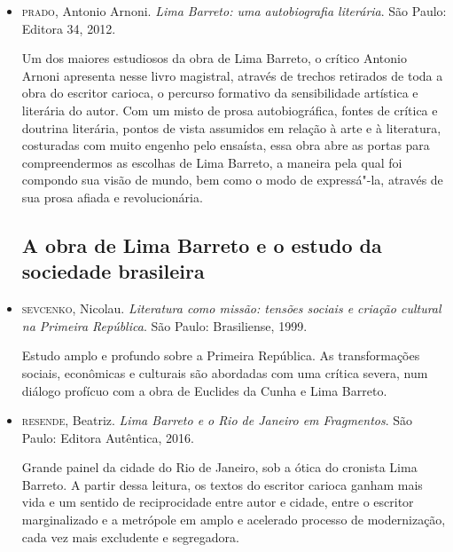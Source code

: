 \documentclass[11pt]{extarticle}
\begin{document}
{{\begin{itemize}
Principal biografia
sobre a vida de Lima Barreto. Publicado em 1952, essa obra se constitui
como o ponto de partida para a redescoberta de Lima Barreto. Assis
Barbosa também foi o organizador das \emph{Obras completas de Lima
Barreto,} publicadas em 1956, em 17 volumes, pela editora Brasiliense. O
livro \emph{A vida de Lima Barreto}, foi escrito de modo a
interrelacionar eventos da vida pessoal do autor com diversas passagens
de sua obra ficcional, assim como a contextualização da época, na
verdade um grande painel histórico, rico em detalhes e informações que
compõem um quadro muito completo desse grande escritor brasileiro.

\item \textsc{prado}, Antonio Arnoni. \emph{Lima Barreto: uma autobiografia literária}.
São Paulo: Editora 34, 2012. 

Um dos maiores estudiosos da obra de Lima
Barreto, o crítico Antonio Arnoni apresenta nesse livro magistral,
através de trechos retirados de toda a obra do escritor carioca, o
percurso formativo da sensibilidade artística e literária do autor. Com
um misto de prosa autobiográfica, fontes de crítica e doutrina
literária, pontos de vista assumidos em relação à arte e à literatura,
costuradas com muito engenho pelo ensaísta, essa obra abre as portas
para compreendermos as escolhas de Lima Barreto, a maneira pela qual foi
compondo sua visão de mundo, bem como o modo de expressá"-la, através de
sua prosa afiada e revolucionária.


\subsection{A obra de Lima Barreto e o estudo da sociedade brasileira}

\item \textsc{sevcenko}, Nicolau. \emph{Literatura como missão: tensões sociais e
criação cultural na Primeira República}. São Paulo: Brasiliense, 1999.

Estudo amplo e profundo sobre a Primeira República. As transformações
sociais, econômicas e culturais são abordadas com uma crítica severa,
num diálogo profícuo com a obra de Euclides da Cunha e Lima Barreto.

\item \textsc{resende}, Beatriz. \emph{Lima Barreto e o Rio de Janeiro em Fragmentos}.
São Paulo: Editora Autêntica, 2016. 

Grande painel da cidade do Rio de Janeiro, 
sob a ótica do cronista Lima Barreto. A partir dessa leitura, os textos 
do escritor carioca ganham mais vida e um sentido de reciprocidade entre 
autor e cidade, entre o escritor marginalizado e a metrópole em amplo 
e acelerado processo de modernização, cada vez mais excludente e segregadora.


\end{itemize}}}
\end{document}
